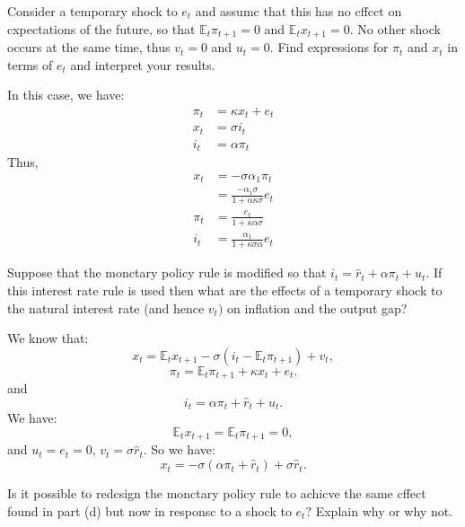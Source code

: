 \begin{problem*}[3]
    Consider a temporary shock to $e_t$ and assumc that this has no cffcct on cxpectations of the future,
    so that $\mathbb{E}_t\pi_{t+1}=0$ and $\mathbb{E}_tx_{t+1}=0.$
    No other shock occurs at the same time, thus $v_t=0$ and $u_t=0.$
    Find expressions for $\pi_t$ and $x_t$ in terms of $e_t$ and interpret your results.
\end{problem*}

\begin{solution}
    In this case, we have:
    \begin{align*}
        \pi_t &= \kappa x_t + e_t\\
        x_t &= \sigma i_t\\
        i_t &= \alpha \pi_t
    \end{align*}
    Thus, 
    \begin{align*}
        x_t &= -\sigma \alpha_1 \pi_t\\
        &= \frac{-\alpha_1 \sigma}{1+\alpha \kappa \sigma}e_t\\
        \pi_t &= \frac{e_t}{1+\kappa \alpha \sigma}\\
        i_t &= \frac{\alpha_1}{1+\kappa \sigma \alpha}e_t
    \end{align*}
\end{solution}

\begin{problem*}[4]
    Suppose that the monctary policy rule is modified so that $i_t=\hat{r}_t+\alpha\pi_t+u_t.$
    If this interest rate rule is used then what are the effects of a temporary shock 
    to the natural interest rate (and hence $v_t)$ on inflation and the output gap?
\end{problem*}

\begin{solution}
    We know that:
    \[
    x_t = \mathbb{E}_t x_{t+1} - \sigma(i_t - \mathbb{E}_t \pi_{t+1}) + v_t,
    \]
    \[
    \pi_t = \mathbb{E}_t \pi_{t+1} + \kappa x_t + e_t.
    \]
    and
    \[
    i_t = \alpha  \pi _t + \hat{r}_t + u_t.
    \]
    We have:
    \[ \mathbb{E}_t x_{t+1} = \mathbb{E}_t \pi_{t+1}=0,\]
    and $u_t = e_t = 0$, $v_t = \sigma \hat{r}_t.$
    So we have:
    \[
    x_t = -\sigma (\alpha \pi_t + \hat{r}_t) + \sigma \hat{r}_t.
    \]

\end{solution}

\begin{problem*}[5]
    Is it possible to redcsign the monctary policy rule to achicve the same cffect found in part (d) but
    now in responsc to a shock to $e_t?$ Explain why or why not.
\end{problem*}